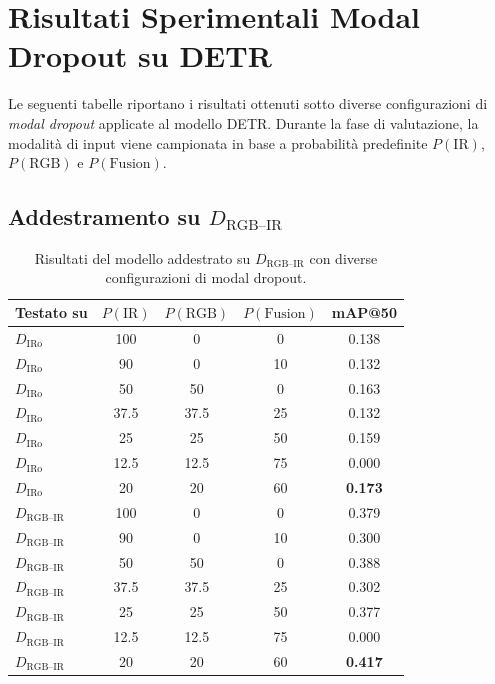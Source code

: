 \documentclass[a4paper,11pt]{article}
\begin{document}
\section*{Risultati Sperimentali Modal Dropout su DETR}

Le seguenti tabelle riportano i risultati ottenuti sotto diverse configurazioni di \emph{modal dropout} applicate al modello DETR.
Durante la fase di valutazione, la modalità di input viene campionata in base a probabilità predefinite $P(\text{IR})$, $P(\text{RGB})$ e $P(\text{Fusion})$.

\subsection*{Addestramento su $D_{\text{RGB--IR}}$}

\begin{table}[h]
\centering
\caption{Risultati del modello addestrato su $D_{\text{RGB--IR}}$ con diverse configurazioni di modal dropout.}
\label{tab:rgbir_train}
\begin{tabular}{lcccc}
\toprule
Testato su & $P(\text{IR})$ & $P(\text{RGB})$ & $P(\text{Fusion})$ & mAP@50 \\
\midrule
$D_{\text{IRo}}$ & 100 & 0 & 0 & 0.138 \\
$D_{\text{IRo}}$ & 90 & 0 & 10 & 0.132 \\
$D_{\text{IRo}}$ & 50 & 50 & 0 & 0.163 \\
$D_{\text{IRo}}$ & 37.5 & 37.5 & 25 & 0.132 \\
$D_{\text{IRo}}$ & 25 & 25 & 50 & 0.159 \\
$D_{\text{IRo}}$ & 12.5 & 12.5 & 75 & 0.000 \\
$D_{\text{IRo}}$ & 20 & 20 & 60 & \textbf{0.173} \\
\midrule
$D_{\text{RGB--IR}}$ & 100 & 0 & 0 & 0.379 \\
$D_{\text{RGB--IR}}$ & 90 & 0 & 10 & 0.300 \\
$D_{\text{RGB--IR}}$ & 50 & 50 & 0 & 0.388 \\
$D_{\text{RGB--IR}}$ & 37.5 & 37.5 & 25 & 0.302 \\
$D_{\text{RGB--IR}}$ & 25 & 25 & 50 & 0.377 \\
$D_{\text{RGB--IR}}$ & 12.5 & 12.5 & 75 & 0.000 \\
$D_{\text{RGB--IR}}$ & 20 & 20 & 60 & \textbf{0.417} \\
\bottomrule
\end{tabular}
\end{table}
\end{document}
